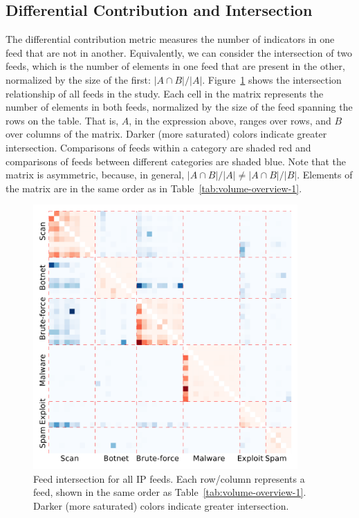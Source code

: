 \subsection{Differential Contribution and Intersection}
\label{sec:ip-overlap}

The differential contribution metric measures the number of indicators in one feed that are not in another. Equivalently, we can consider the intersection of two feeds, which is the number of elements in one feed that are present in the other, normalized by the size of the first: $|A\cap B|/|A|$. Figure~\ref{fig:overall_heatmap} shows the intersection relationship of all feeds in the study. Each cell in the matrix represents the number of elements in both feeds, normalized by the size of the feed spanning the rows on the table. That is, $A$, in the expression above, ranges over rows, and $B$ over columns of the matrix. Darker (more saturated) colors indicate greater intersection. Comparisons of feeds within a category are shaded red and comparisons of feeds between different categories are shaded blue. Note that the matrix is asymmetric, because, in general, $|A\cap B|/|A| \neq |A\cap B|/|B|$. Elements of the matrix are in the same order as in Table~\ref{tab:volume-overview-1}.

\begin{figure}
\centering
\includegraphics[width=0.9\textwidth]{data_character/images/overall_heatmap.pdf}
\caption{Feed intersection for all IP feeds. Each row/column represents a feed, shown in the same order as Table~\ref{tab:volume-overview-1}. Darker (more saturated) colors indicate greater intersection.}
\label{fig:overall_heatmap}
\end{figure}

